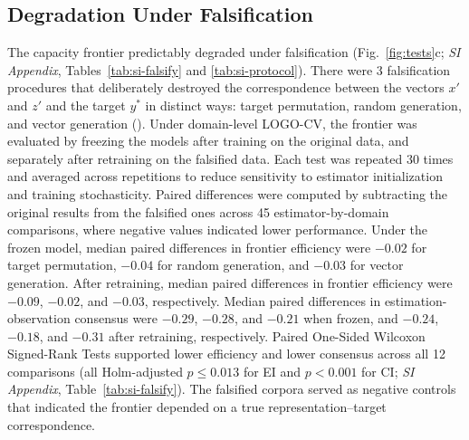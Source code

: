 \documentclass{article}
\begin{document}
\subsection*{Degradation Under Falsification}
\label{sub-sec:falsify}
The capacity frontier predictably degraded under falsification (Fig.~\ref{fig:tests}c; \textit{SI Appendix}, Tables~\ref{tab:si-falsify} and \ref{tab:si-protocol}). There were 3 falsification procedures that deliberately destroyed the correspondence between the vectors $x'$ and $z'$ and the target $y^*$ in distinct ways: target permutation, random generation, and vector generation (). Under domain-level LOGO-CV, the frontier was evaluated by freezing the models after training on the original data, and separately after retraining on the falsified data. Each test was repeated 30 times and averaged across repetitions to reduce sensitivity to estimator initialization and training stochasticity. Paired differences were computed by subtracting the original results from the falsified ones across 45 estimator-by-domain comparisons, where negative values indicated lower performance. Under the frozen model, median paired differences in frontier efficiency were $-0.02$ for target permutation, $-0.04$ for random generation, and $-0.03$ for vector generation. After retraining, median paired differences in frontier efficiency were $-0.09$, $-0.02$, and $-0.03$, respectively. Median paired differences in estimation-observation consensus were $-0.29$, $-0.28$, and $-0.21$ when frozen, and $-0.24$, $-0.18$, and $-0.31$ after retraining, respectively. Paired One-Sided Wilcoxon Signed-Rank Tests supported lower efficiency and lower consensus across all 12 comparisons (all Holm-adjusted $p \le 0.013$ for EI and $p < 0.001$ for CI; \textit{SI Appendix}, Table~\ref{tab:si-falsify}). The falsified corpora served as negative controls that indicated the frontier depended on a true representation–target correspondence.
\end{document}
